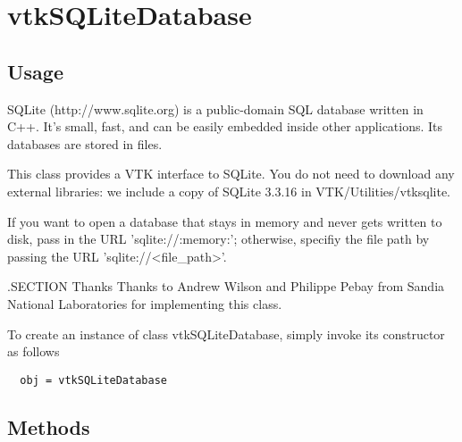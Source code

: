 \section{vtkSQLiteDatabase}

\subsection{Usage}


 SQLite (http://www.sqlite.org) is a public-domain SQL database
 written in C++.  It's small, fast, and can be easily embedded
 inside other applications.  Its databases are stored in files.

 This class provides a VTK interface to SQLite.  You do not need to
 download any external libraries: we include a copy of SQLite 3.3.16
 in VTK/Utilities/vtksqlite.  

 If you want to open a database that stays in memory and never gets
 written to disk, pass in the URL 'sqlite://:memory:'; otherwise,
 specifiy the file path by passing the URL 'sqlite://<file\_path>'.

 .SECTION Thanks
 Thanks to Andrew Wilson and Philippe Pebay from Sandia National 
 Laboratories for implementing this class.


To create an instance of class vtkSQLiteDatabase, simply
invoke its constructor as follows
\begin{verbatim}
  obj = vtkSQLiteDatabase
\end{verbatim}
\subsection{Methods}


